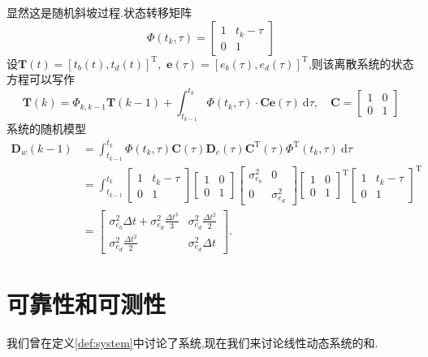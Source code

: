 \documentclass[cn,10pt,citestyle=gb7714-2015,bibstyle=gb7714-2015]{elegantbook}
\newcommand{\md}{\ \mathrm{d}}
\newcommand{\mT}{\mathrm{T}}
\begin{document}
\begin{solution}
  显然这是随机斜坡过程.状态转移矩阵
  \[
      \bm{\varPhi}(t_k,\tau)=\begin{bmatrix}
        1&t_k-\tau\\
        0&1
      \end{bmatrix}
  \]
  设$\bm{T}(t)=[t_b(t),t_d(t)]^\mT$,\ $\bm{e}(\tau)=[e_b(\tau),e_d(\tau)]^\mT$,则该离散系统的状态方程可以写作
  \[
      \bm{T}(k)=\bm{\varPhi}_{k,k-1}\bm{T}(k-1)+\int_{t_{k-1}}^{t_k}\bm{\varPhi}(t_k,\tau)\cdot\bm{C}\bm{e}(\tau)\md\tau,\quad\bm{C}=\begin{bmatrix}
        1&0\\
        0&1
      \end{bmatrix}
  \]
  系统的随机模型
  \begin{align*}
    \bm{D}_w(k-1)&=\int_{t_{k-1}}^{t_k}\bm{\varPhi}(t_k,\tau)\bm{C}(\tau)\bm{D}_e(\tau)\bm{C}^\mT(\tau)\bm{\varPhi}^\mT(t_k,\tau)\md\tau\\
    &=\int_{t_{k-1}}^{t_k}\begin{bmatrix}
      1&t_k-\tau\\
      0&1
    \end{bmatrix}
    \begin{bmatrix}
      1&0\\
      0&1
    \end{bmatrix}
    \begin{bmatrix}
      \sigma_{e_b}^2&0\\
      0&\sigma_{e_d}^2
    \end{bmatrix}
    \begin{bmatrix}
      1&0\\
      0&1
    \end{bmatrix}^\mT
    \begin{bmatrix}
      1&t_k-\tau\\
      0&1
    \end{bmatrix}^\mT\\
    &=\begin{bmatrix}
      \sigma_{e_b}^2\Delta t+\sigma_{e_d}^2\frac{\Delta t^3}{3}&\sigma_{e_d}^2\frac{\Delta t^2}{2}\\
      \sigma_{e_d}^2\frac{\Delta t^2}{2}&\sigma_{e_d}^2\Delta t
    \end{bmatrix}.
  \end{align*}
\end{solution}
\section{可靠性和可测性}
我们曾在定义\ref{def:system}中讨论了系统,现在我们来讨论线性动态系统的和.
\end{document}
